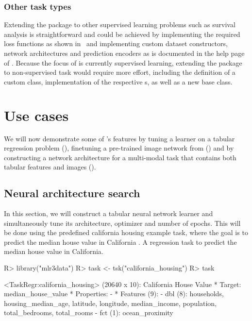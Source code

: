 \documentclass[article]{jss}
\theoremstyle{definition}
\begin{document}
\subsubsection{Other task types}

Extending the package to other supervised learning problems such as survival analysis is straightforward and could be achieved by implementing the required loss functions as shown in~ and implementing custom dataset constructors, network architectures and prediction encoders as is documented in the help page of .
Because the focus of  is currently  supervised learning, extending the package to non-supervised task would require more effort, including the definition of a custom  class, implementation of the respective s, as well as a new  base class.

\section{Use cases}\label{sec:use-cases}

We will now demonstrate some of 's features by tuning a \torch{} learner on a tabular regression problem (), finetuning a pre-trained image network from  () and by constructing a network architecture for a multi-modal task that contains both tabular features and images ().

\subsection{Neural architecture search}\label{sec:tuning}

In this section, we will construct a tabular neural network learner and simultaneously tune its architecture, optimizer and number of epochs.
This will be done using the predefined california housing example task, where the goal is to predict the median house value in California \citep{ref-pace1997sparse}.
A regression task to predict the median house value in California.

\begin{CodeInput}
R> library("mlr3data")
R> task <- tsk("california_housing")
R> task
\end{CodeInput}
\begin{CodeOutput}
<TaskRegr:california_housing> (20640 x 10): California House Value
* Target: median_house_value
* Properties: -
* Features (9):
  - dbl (8): households, housing_median_age, latitude, longitude,
    median_income, population, total_bedrooms, total_rooms
  - fct (1): ocean_proximity
\end{CodeOutput}
\end{document}
